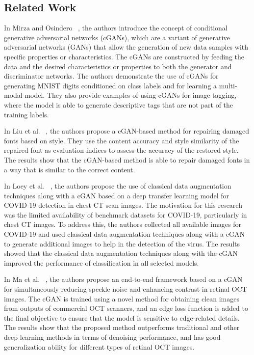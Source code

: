 \subsection{Related Work}\label{subsec:related-work}
In Mirza and Osindero~\cite{Mirza2014} , the authors introduce the concept of conditional generative adversarial networks (cGANs), which are a variant of generative adversarial networks (GANs) that allow the generation of new data samples with specific properties or characteristics.
The cGANs are constructed by feeding the data and the desired characteristics or properties to both the generator and discriminator networks.
The authors demonstrate the use of cGANs for generating MNIST digits conditioned on class labels and for learning a multi-modal model.
They also provide examples of using cGANs for image tagging, where the model is able to generate descriptive tags that are not part of the training labels.

In Liu et al.~\cite{Liu2021SCCGAN:CGAN} , the authors propose a cGAN-based method for repairing damaged fonts based on style.
They use the content accuracy and style similarity of the repaired font as evaluation indices to assess the accuracy of the restored style.
The results show that the cGAN-based method is able to repair damaged fonts in a way that is similar to the correct content.

In Loey et al.~\cite{Loey2020AImages} , the authors propose the use of classical data augmentation techniques along with a cGAN based on a deep transfer learning model for COVID-19 detection in chest CT scan images.
The motivation for this research was the limited availability of benchmark datasets for COVID-19, particularly in chest CT images.
To address this, the authors collected all available images for COVID-19 and used classical data augmentation techniques along with a cGAN to generate additional images to help in the detection of the virus.
The results showed that the classical data augmentation techniques along with the cGAN improved the performance of classification in all selected models.

In Ma et al.~\cite{Ma2018SpeckleCGAN} , the authors propose an end-to-end framework based on a cGAN for simultaneously reducing speckle noise and enhancing contrast in retinal OCT images.
The cGAN is trained using a novel method for obtaining clean images from outputs of commercial OCT scanners, and an edge loss function is added to the final objective to ensure that the model is sensitive to edge-related details.
The results show that the proposed method outperforms traditional and other deep learning methods in terms of denoising performance, and has good generalization ability for different types of retinal OCT images.